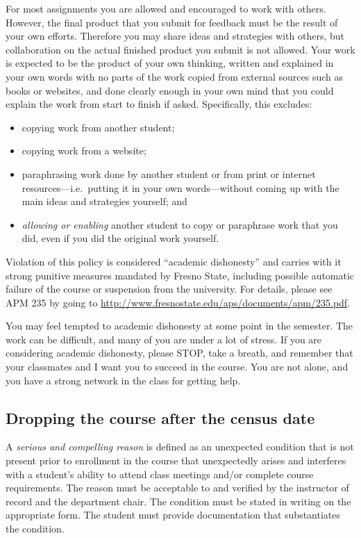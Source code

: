 For most assignments you are allowed and encouraged to work with others.
However, the final product that you submit for feedback must be the
result of your own efforts. Therefore you may share ideas and strategies
with others, but collaboration on the actual finished product you submit
is not allowed. Your work is expected to be the product of your own
thinking, written and explained in your own words with no parts of the
work copied from external sources such as books or websites, and done
clearly enough in your own mind that you could explain the work from
start to finish if asked. Specifically, this excludes:

\begin{itemize}
\tightlist
\item
  copying work from another student;
\item
  copying work from a website;
\item
  paraphrasing work done by another student or from print or internet
  resources---i.e.~putting it in your own words---without coming up with
  the main ideas and strategies yourself; and
\item
  \emph{allowing or enabling} another student to copy or paraphrase work
  that you did, even if you did the original work yourself.
\end{itemize}

Violation of this policy is considered ``academic dishonesty'' and
carries with it strong punitive measures mandated by Fresno State,
including possible automatic failure of the course or suspension from
the university. For details, please see APM 235 by going to
\url{http://www.fresnostate.edu/aps/documents/apm/235.pdf}.

You may feel tempted to academic dishonesty at some point in the
semester. The work can be difficult, and many of you are under a lot of
stress. If you are considering academic dishonesty, please STOP, take a
breath, and remember that your classmates and I want you to succeed in
the course. You are not alone, and you have a strong network in the
class for getting help.

\hypertarget{dropping-the-course-after-the-census-date}{%
\subsection{Dropping the course after the census
date}\label{dropping-the-course-after-the-census-date}}

A \emph{serious and compelling reason} is defined as an unexpected
condition that is not present prior to enrollment in the course that
unexpectedly arises and interferes with a student's ability to attend
class meetings and/or complete course requirements. The reason must be
acceptable to and verified by the instructor of record and the
department chair. The condition must be stated in writing on the
appropriate form. The student must provide documentation that
substantiates the condition.

